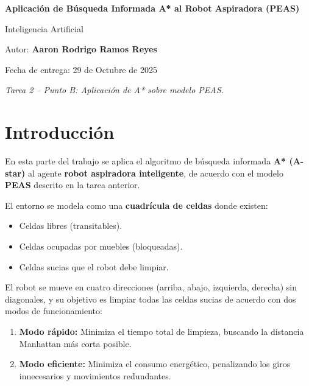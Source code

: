 \documentclass[12pt,a4paper]{article}
\begin{document}
\begin{titlepage}
\centering

{\huge\bfseries Aplicación de Búsqueda Informada A* al Robot Aspiradora (PEAS)\par}
\vspace{1.5cm}
{\Large Inteligencia Artificial\par}
\vspace{1cm}
{\Large Autor: \textbf{Aaron Rodrigo Ramos Reyes}\par}
\vspace{0.5cm}
{\large Fecha de entrega: 29 de Octubre de 2025\par}
\vfill
{\large \textit{Tarea 2 – Punto B: Aplicación de A* sobre modelo PEAS.}\par}
\vspace{1cm}

\end{titlepage}

\section{Introducción}

En esta parte del trabajo se aplica el algoritmo de búsqueda informada \textbf{A* (A-star)} al agente \textbf{robot aspiradora inteligente}, de acuerdo con el modelo \textbf{PEAS} descrito en la tarea anterior.

El entorno se modela como una \textbf{cuadrícula de celdas} donde existen:
\begin{itemize}
    \item Celdas libres (transitables).
    \item Celdas ocupadas por muebles (bloqueadas).
    \item Celdas sucias que el robot debe limpiar.
\end{itemize}

El robot se mueve en cuatro direcciones (arriba, abajo, izquierda, derecha) sin diagonales, y su objetivo es limpiar todas las celdas sucias de acuerdo con dos modos de funcionamiento:
\begin{enumerate}
    \item \textbf{Modo rápido:} Minimiza el tiempo total de limpieza, buscando la distancia Manhattan más corta posible.
    \item \textbf{Modo eficiente:} Minimiza el consumo energético, penalizando los giros innecesarios y movimientos redundantes.
\end{enumerate}
\end{document}
